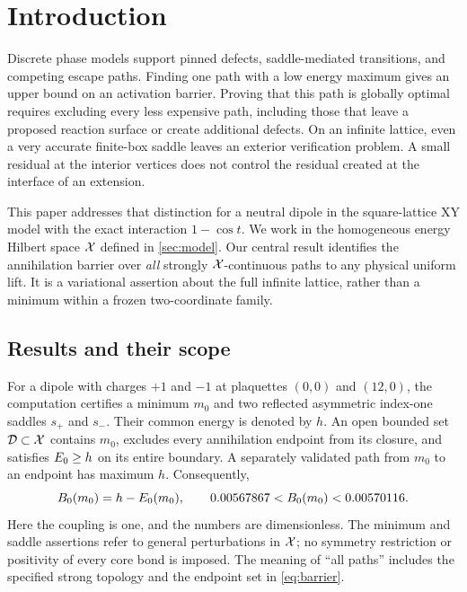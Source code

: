 \section{Introduction}\label{sec:intro}

Discrete phase models support pinned defects, saddle-mediated transitions, and competing escape paths. Finding one path with a low energy maximum gives an upper bound on an activation barrier. Proving that this path is globally optimal requires excluding every less expensive path, including those that leave a proposed reaction surface or create additional defects. On an infinite lattice, even a very accurate finite-box saddle leaves an exterior verification problem. A small residual at the interior vertices does not control the residual created at the interface of an extension.

This paper addresses that distinction for a neutral dipole in the square-lattice XY model with the exact interaction $1-\cos t$. We work in the homogeneous energy Hilbert space $\mathcal X$ defined in \cref{sec:model}. Our central result identifies the annihilation barrier over \emph{all} strongly $\mathcal X$-continuous paths to any physical uniform lift. It is a variational assertion about the full infinite lattice, rather than a minimum within a frozen two-coordinate family.

\subsection{Results and their scope}

For a dipole with charges $+1$ and $-1$ at plaquettes $(0,0)$ and $(12,0)$, the computation certifies a minimum $m_0$ and two reflected asymmetric index-one saddles $s_+$ and $s_-$. Their common energy is denoted by $h$. An open bounded set $\mathcal D\subset\mathcal X$ contains $m_0$, excludes every annihilation endpoint from its closure, and satisfies $E_0\ge h$ on its entire boundary. A separately validated path from $m_0$ to an endpoint has maximum $h$. Consequently,
\begin{equation}\label{eq:intro-barrier}
 B_0(m_0)=h-E_0(m_0),\qquad
 0.00567867<B_0(m_0)<0.00570116.
\end{equation}
Here the coupling is one, and the numbers are dimensionless. The minimum and saddle assertions refer to general perturbations in $\mathcal X$; no symmetry restriction or positivity of every core bond is imposed. The meaning of ``all paths'' includes the specified strong topology and the endpoint set in \cref{eq:barrier}.

